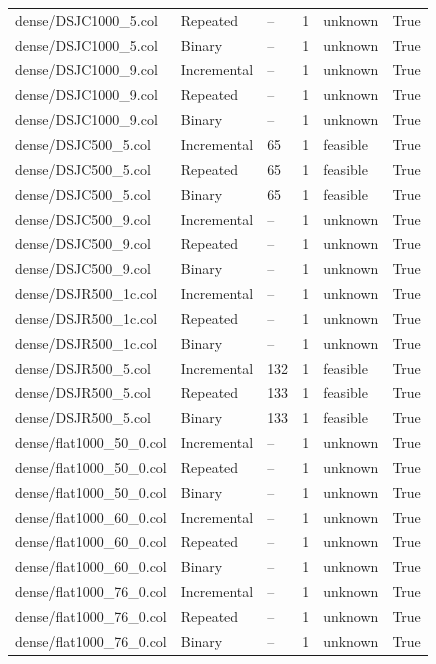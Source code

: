 \begin{table}[htbp]
\begin{tabular}{llllll}
dense/DSJC1000\_5.col & Repeated & -- & 1 & unknown & True \\
dense/DSJC1000\_5.col & Binary & -- & 1 & unknown & True \\
dense/DSJC1000\_9.col & Incremental & -- & 1 & unknown & True \\
dense/DSJC1000\_9.col & Repeated & -- & 1 & unknown & True \\
dense/DSJC1000\_9.col & Binary & -- & 1 & unknown & True \\
dense/DSJC500\_5.col & Incremental & 65 & 1 & feasible & True \\
dense/DSJC500\_5.col & Repeated & 65 & 1 & feasible & True \\
dense/DSJC500\_5.col & Binary & 65 & 1 & feasible & True \\
dense/DSJC500\_9.col & Incremental & -- & 1 & unknown & True \\
dense/DSJC500\_9.col & Repeated & -- & 1 & unknown & True \\
dense/DSJC500\_9.col & Binary & -- & 1 & unknown & True \\
dense/DSJR500\_1c.col & Incremental & -- & 1 & unknown & True \\
dense/DSJR500\_1c.col & Repeated & -- & 1 & unknown & True \\
dense/DSJR500\_1c.col & Binary & -- & 1 & unknown & True \\
dense/DSJR500\_5.col & Incremental & 132 & 1 & feasible & True \\
dense/DSJR500\_5.col & Repeated & 133 & 1 & feasible & True \\
dense/DSJR500\_5.col & Binary & 133 & 1 & feasible & True \\
dense/flat1000\_50\_0.col & Incremental & -- & 1 & unknown & True \\
dense/flat1000\_50\_0.col & Repeated & -- & 1 & unknown & True \\
dense/flat1000\_50\_0.col & Binary & -- & 1 & unknown & True \\
dense/flat1000\_60\_0.col & Incremental & -- & 1 & unknown & True \\
dense/flat1000\_60\_0.col & Repeated & -- & 1 & unknown & True \\
dense/flat1000\_60\_0.col & Binary & -- & 1 & unknown & True \\
dense/flat1000\_76\_0.col & Incremental & -- & 1 & unknown & True \\
dense/flat1000\_76\_0.col & Repeated & -- & 1 & unknown & True \\
dense/flat1000\_76\_0.col & Binary & -- & 1 & unknown & True \\

\end{tabular}
\end{table}
